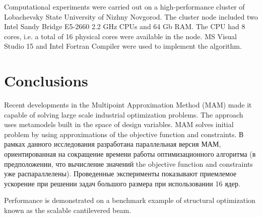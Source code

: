 \documentclass[runningheads,a4paper]{llncs}
\begin{document}

Computational experiments were carried out on a high-performance cluster of Lobachevsky State University of Nizhny Novgorod. The cluster node included two Intel Sandy Bridge E5-2660 2.2 GHz CPUs and 64 Gb RAM. The CPU had 8 cores, i.e. a total of 16 physical cores were available in the node. MS Visual Studio 15 and Intel Fortran Compiler were used to implement the algorithm.

\section{Conclusions}

Recent developments in the Multipoint Approximation Method (MAM) made it capable of solving large scale industrial optimization problems. The approach uses metamodels built in the space of design variables. MAM solves initial problem by using approximations of the objective function and constraints.
\Russian
В рамках данного исследования разработана параллельная версия МАМ, ориентированная на сокращение времени работы оптимизационного алгоритма (в предположении, что вычисление значений the objective function and constraints уже распараллелены). Проведенные эксперименты показывают приемлемое ускорение при решении задач большого размера при использовании 16 ядер. 

Performance is demonstrated on a benchmark example of structural optimization known as the scalable cantilevered beam.  



{}

\end{document}
